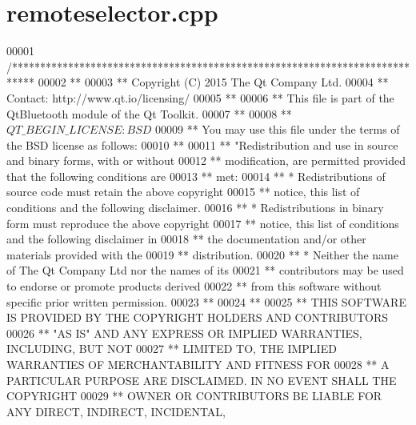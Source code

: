 \hypertarget{remoteselector_8cpp_source}{}\section{remoteselector.\+cpp}
\label{remoteselector_8cpp_source}

\begin{DoxyCode}
00001 \textcolor{comment}{/****************************************************************************}
00002 \textcolor{comment}{**}
00003 \textcolor{comment}{** Copyright (C) 2015 The Qt Company Ltd.}
00004 \textcolor{comment}{** Contact: http://www.qt.io/licensing/}
00005 \textcolor{comment}{**}
00006 \textcolor{comment}{** This file is part of the QtBluetooth module of the Qt Toolkit.}
00007 \textcolor{comment}{**}
00008 \textcolor{comment}{** $QT\_BEGIN\_LICENSE:BSD$}
00009 \textcolor{comment}{** You may use this file under the terms of the BSD license as follows:}
00010 \textcolor{comment}{**}
00011 \textcolor{comment}{** "Redistribution and use in source and binary forms, with or without}
00012 \textcolor{comment}{** modification, are permitted provided that the following conditions are}
00013 \textcolor{comment}{** met:}
00014 \textcolor{comment}{**   * Redistributions of source code must retain the above copyright}
00015 \textcolor{comment}{**     notice, this list of conditions and the following disclaimer.}
00016 \textcolor{comment}{**   * Redistributions in binary form must reproduce the above copyright}
00017 \textcolor{comment}{**     notice, this list of conditions and the following disclaimer in}
00018 \textcolor{comment}{**     the documentation and/or other materials provided with the}
00019 \textcolor{comment}{**     distribution.}
00020 \textcolor{comment}{**   * Neither the name of The Qt Company Ltd nor the names of its}
00021 \textcolor{comment}{**     contributors may be used to endorse or promote products derived}
00022 \textcolor{comment}{**     from this software without specific prior written permission.}
00023 \textcolor{comment}{**}
00024 \textcolor{comment}{**}
00025 \textcolor{comment}{** THIS SOFTWARE IS PROVIDED BY THE COPYRIGHT HOLDERS AND CONTRIBUTORS}
00026 \textcolor{comment}{** "AS IS" AND ANY EXPRESS OR IMPLIED WARRANTIES, INCLUDING, BUT NOT}
00027 \textcolor{comment}{** LIMITED TO, THE IMPLIED WARRANTIES OF MERCHANTABILITY AND FITNESS FOR}
00028 \textcolor{comment}{** A PARTICULAR PURPOSE ARE DISCLAIMED. IN NO EVENT SHALL THE COPYRIGHT}
00029 \textcolor{comment}{** OWNER OR CONTRIBUTORS BE LIABLE FOR ANY DIRECT, INDIRECT, INCIDENTAL,}

\end{DoxyCode}
